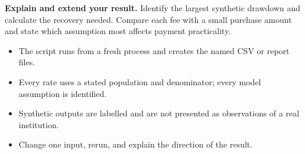 \begin{verification}
\textbf{Explain and extend your result.} Identify the largest synthetic drawdown and calculate the recovery needed. Compare each fee with a small purchase amount and state which assumption most affects payment practicality.

\begin{itemize}\item The script runs from a fresh process and creates the named CSV or report files.\item Every rate uses a stated population and denominator; every model assumption is identified.\item Synthetic outputs are labelled and are not presented as observations of a real institution.\item Change one input, rerun, and explain the direction of the result.\end{itemize}\end{verification}
